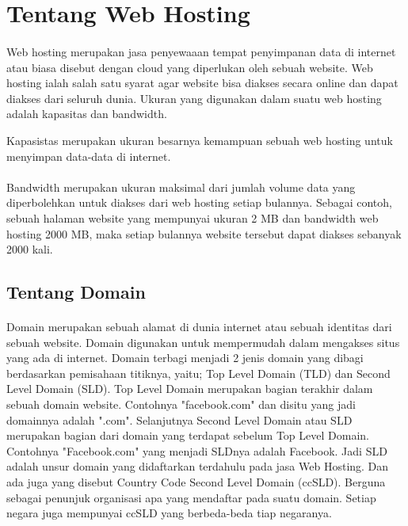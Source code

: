 \documentclass[12pt, a4paper]{article}
\begin{document}
\section{Tentang Web Hosting}
\paragraph{}Web hosting merupakan jasa penyewaaan tempat penyimpanan data di internet atau biasa disebut dengan cloud
yang diperlukan oleh sebuah website. Web hosting ialah salah satu syarat agar website bisa diakses secara 
online dan dapat diakses dari seluruh dunia. Ukuran yang digunakan dalam suatu web hosting adalah kapasitas
dan bandwidth. 

Kapasistas merupakan ukuran besarnya kemampuan sebuah web hosting untuk menyimpan data-data di internet.

\paragraph{}Bandwidth merupakan ukuran maksimal dari jumlah volume data yang diperbolehkan untuk diakses dari web hosting
setiap bulannya. Sebagai contoh, sebuah halaman website yang mempunyai ukuran 2 MB dan bandwidth web hosting
2000 MB, maka setiap bulannya website tersebut dapat diakses sebanyak 2000 kali.

\subsection{Tentang Domain}
\paragraph{}Domain merupakan sebuah alamat di dunia internet atau sebuah identitas dari sebuah website. Domain digunakan untuk mempermudah dalam mengakses situs yang ada di internet. Domain terbagi menjadi 2 jenis domain yang dibagi berdasarkan pemisahaan titiknya, yaitu; Top Level Domain (TLD) dan Second Level Domain (SLD). Top Level Domain merupakan bagian terakhir dalam sebuah domain website. Contohnya "facebook.com" dan disitu yang jadi domainnya adalah ".com". Selanjutnya Second Level Domain atau SLD merupakan bagian dari domain yang terdapat sebelum Top Level Domain. Contohnya "Facebook.com" yang menjadi SLDnya adalah Facebook. Jadi SLD adalah unsur domain yang didaftarkan terdahulu pada jasa Web Hosting. Dan ada juga yang disebut Country Code Second Level Domain (ccSLD). Berguna sebagai penunjuk organisasi apa yang mendaftar pada suatu domain. Setiap negara juga mempunyai ccSLD yang berbeda-beda tiap negaranya.
\end{document}
